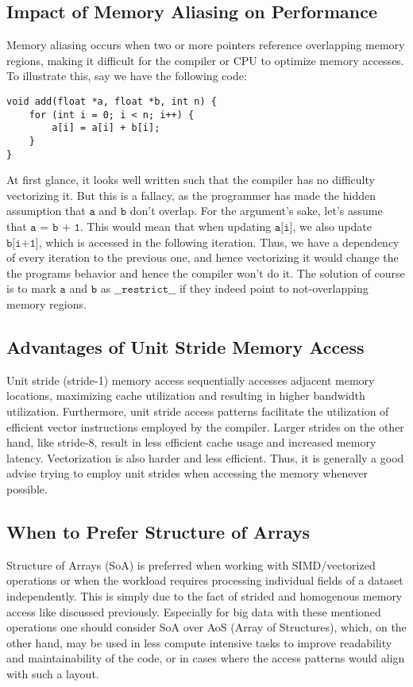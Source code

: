 \documentclass[../../main.tex]{subfiles}
\begin{document}
    \subsection{Impact of Memory Aliasing on Performance}
    Memory aliasing occurs when two or more pointers reference overlapping memory regions, making it difficult for the compiler or CPU to optimize memory accesses.
    To illustrate this, say we have the following code:

    \begin{lstlisting}
void add(float *a, float *b, int n) {
    for (int i = 0; i < n; i++) {
        a[i] = a[i] + b[i]; 
    }
}
    \end{lstlisting}

    \noindent
    At first glance, it looks well written such that the compiler has no difficulty vectorizing it. But this is a fallacy, as the programmer has made the hidden assumption that $\texttt{a}$ and $\texttt{b}$ don't overlap. For the argument's sake, let's assume that $\texttt{a = b + 1}$. This would mean that when updating $\texttt{a[i]}$, we also update $\texttt{b[i+1]}$, which is accessed in the following iteration. Thus, we have a dependency of every iteration to the previous one, and hence vectorizing it would change the the programs behavior and hence the compiler won't do it. The solution of course is to mark $\texttt{a}$ and $\texttt{b}$ as $\texttt{\_\_restrict\_\_}$ if they indeed point to not-overlapping memory regions.

    \bigskip
    \subsection{Advantages of Unit Stride Memory Access}
    Unit stride (stride-1) memory access sequentially accesses adjacent memory locations, maximizing cache utilization and resulting in higher bandwidth utilization. Furthermore, unit stride access patterns facilitate the utilization of efficient vector instructions employed by the compiler. Larger strides on the other hand, like stride-8, result in less efficient cache usage and increased memory latency. Vectorization is also harder and less efficient. Thus, it is generally a good advise trying to employ unit strides when accessing the memory whenever possible. 

    \bigskip
    \subsection{When to Prefer Structure of Arrays}
    Structure of Arrays (SoA) is preferred when working with SIMD/vectorized operations or when the workload requires processing individual fields of a dataset independently. This is simply due to the fact of strided and homogenous memory access like discussed previously. Especially for big data with these mentioned operations one should consider SoA over AoS (Array of Structures), which, on the other hand, may be used in less compute intensive tasks to improve readability and maintainability of the code, or in cases where the access patterns would align with such a layout. 
            
\end{document}
